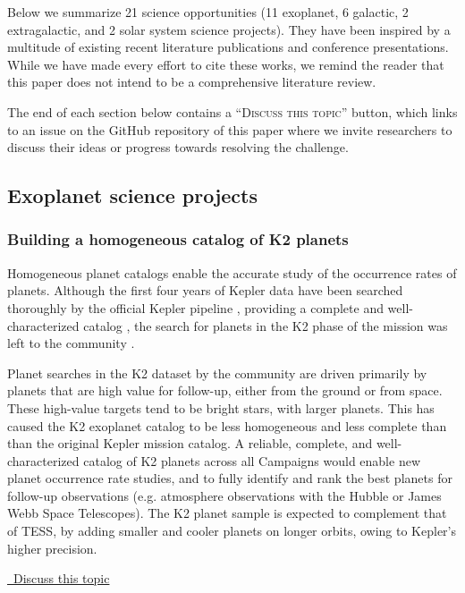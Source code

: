 \documentclass[modern]{aastex62}
\newcommand{\commentlink}[1]{\href{https://github.com/KeplerGO/ScientificOpportunities/issues/#1}{\sc \faExternalLink\ Discuss this topic}\,\,}
\begin{document}
Below we summarize 21 science opportunities (11 exoplanet, 6 galactic, 2 extragalactic, and 2 solar system science projects). They have been inspired by a multitude of existing recent literature publications and conference presentations. While we have made every effort to cite these works, we remind the reader that this paper does not intend to be a comprehensive literature review.

The end of each section below contains a ``\textsc{Discuss this topic}'' button, which links to an issue on the GitHub repository of this paper where we invite researchers to discuss their ideas or progress towards resolving the challenge.\\


\subsection{Exoplanet science projects}


\subsubsection{Building a homogeneous catalog of K2 planets}
Homogeneous planet catalogs enable the accurate study of the occurrence rates of planets. Although the first four years of Kepler data have been searched thoroughly by the official Kepler pipeline \citep{jenkins2010}, providing a complete and well-characterized catalog \citep[][and references therein]{thompson2018}, the search for planets in the K2 phase of the mission was left to the community \citep[e.g.][]{foreman-mackey2015,montet2015,barros2016,crossfield2016,pope2016,dressing2017,vanderburg2016,luger2016,luger2018,petigura2018,livingston2018,mayo2018,yu2018}.

Planet searches in the K2 dataset by the community are driven primarily by planets that are high value for follow-up, either from the ground or from space. These high-value targets tend to be bright stars, with larger planets. This has caused the K2 exoplanet catalog to be less homogeneous and less complete than than the original Kepler mission catalog. A reliable, complete, and well-characterized catalog of K2 planets across all Campaigns would enable new planet occurrence rate studies, and to fully identify and rank the best planets for follow-up observations (e.g. atmosphere observations with the Hubble or James Webb Space Telescopes).  The K2 planet sample is expected to complement that of TESS, by adding smaller and cooler planets on longer orbits, owing to Kepler's higher precision.\\
\begin{center}
\commentlink{1}
\end{center}
\ \\
\end{document}
